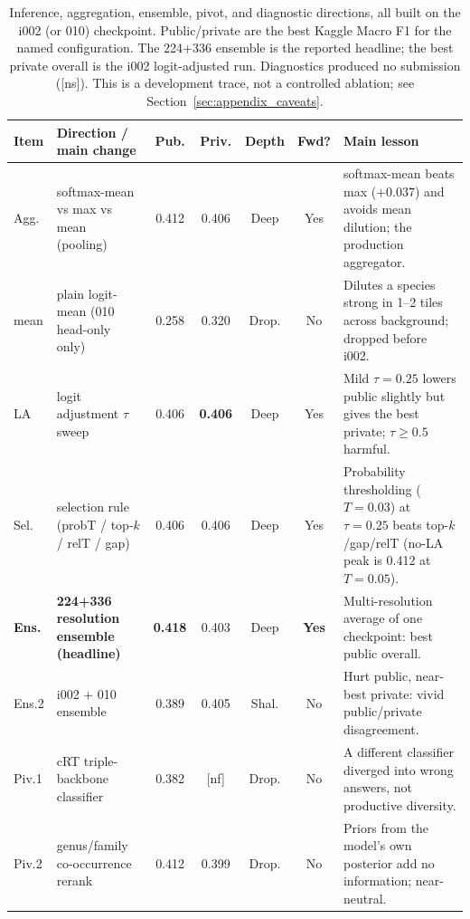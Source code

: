 \begin{table}[t]
\centering
\scriptsize
\setlength{\tabcolsep}{4pt}
\renewcommand{\arraystretch}{1.15}
\caption{Inference, aggregation, ensemble, pivot, and diagnostic directions, all built on
the i002 (or 010) checkpoint. Public/private are the best Kaggle Macro F1 for the named
configuration. The 224+336 ensemble is the reported headline; the best private overall is
the i002 logit-adjusted run. Diagnostics produced no submission ([ns]). This is a
development trace, not a controlled ablation; see Section~\ref{sec:appendix_caveats}.}
\label{tab:appendix_inference}
\begin{tabularx}{\linewidth}{@{}l l c c c c X@{}}
\toprule
\textbf{Item} & \textbf{Direction / main change} & \textbf{Pub.} & \textbf{Priv.} & \textbf{Depth} & \textbf{Fwd?} & \textbf{Main lesson} \\
\midrule
Agg. & softmax-mean vs max vs mean (pooling) & 0.412 & 0.406 & Deep & Yes & softmax-mean beats max ($+0.037$) and avoids mean dilution; the production aggregator. \\
mean & plain logit-mean (010 head-only only) & 0.258 & 0.320 & Drop. & No & Dilutes a species strong in 1--2 tiles across background; dropped before i002. \\
LA & logit adjustment $\tau$ sweep & 0.406 & \textbf{0.406} & Deep & Yes & Mild $\tau{=}0.25$ lowers public slightly but gives the best private; $\tau{\geq}0.5$ harmful. \\
Sel. & selection rule (probT / top-$k$ / relT / gap) & 0.406 & 0.406 & Deep & Yes & Probability thresholding ($T{=}0.03$) at $\tau{=}0.25$ beats top-$k$/gap/relT (no-LA peak is 0.412 at $T{=}0.05$). \\
\textbf{Ens.} & \textbf{224+336 resolution ensemble (headline)} & \textbf{0.418} & 0.403 & Deep & \textbf{Yes} & Multi-resolution average of one checkpoint: best public overall. \\
Ens.2 & i002 + 010 ensemble & 0.389 & 0.405 & Shal. & No & Hurt public, near-best private: vivid public/private disagreement. \\
Piv.1 & cRT triple-backbone classifier & 0.382 & [nf] & Drop. & No & A different classifier diverged into wrong answers, not productive diversity. \\
Piv.2 & genus/family co-occurrence rerank & 0.412 & 0.399 & Drop. & No & Priors from the model's own posterior add no information; near-neutral. \\

\end{tabularx}
\end{table}
